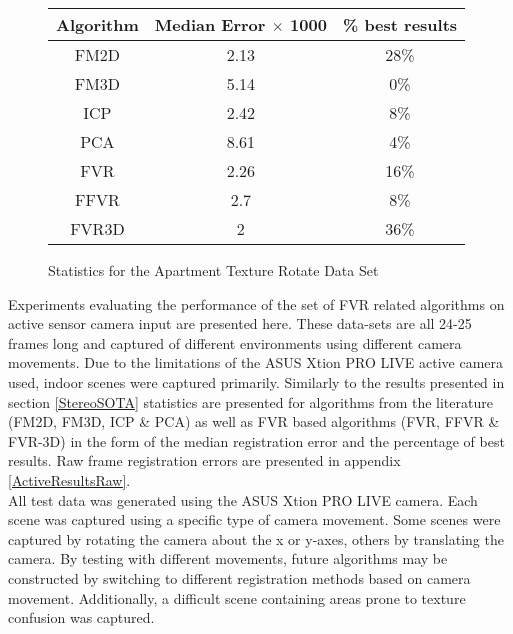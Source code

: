

\begin{figure}
\centering
\begin{tabular}{ccc}
\hline
\textbf{Algorithm} & \textbf{Median Error $\times$ 1000} & \textbf{\% best results}\\ \hline
FM2D	& 2.13 & 28\%\\
FM3D	& 5.14 & 0\%\\
ICP	& 2.42 & 8\%\\
PCA	& 8.61 & 4\%\\
FVR	& 2.26 & 16\%\\
FFVR	& 2.7 & 8\%\\
FVR3D	& 2 & 36\%\\
\end{tabular}
\caption{Statistics for the Apartment Texture Rotate Data Set}
\label{tab:apartmenttexturerotate}
\end{figure} 


Experiments evaluating the performance of the set of FVR related algorithms on active sensor camera input are presented here. These data-sets are all 24-25 frames long and captured of different environments using different camera movements. Due to the limitations of the ASUS Xtion PRO LIVE active camera used, indoor scenes were captured primarily. Similarly to the results presented in section \ref{StereoSOTA} statistics are presented for algorithms from the literature (FM2D, FM3D, ICP \& PCA) as well as FVR based algorithms (FVR, FFVR \& FVR-3D) in the form of the median registration error and the percentage of best results. Raw frame registration errors are presented in appendix \ref{ActiveResultsRaw}. \\

All test data was generated using the ASUS Xtion PRO LIVE camera. Each scene was captured using a specific type of camera movement. Some scenes were captured by rotating the camera about the x or y-axes, others by translating the camera. By testing with different movements, future algorithms may be constructed by switching to different registration methods based on camera movement. Additionally, a difficult scene containing areas prone to texture confusion was captured. \\

